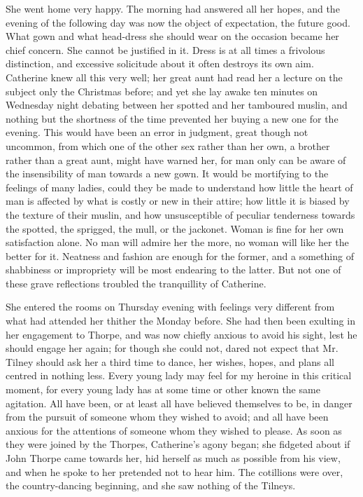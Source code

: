 She went home very happy. The morning had answered all her hopes, and the evening of the following day was now the object of expectation, the future good. What gown and what head-dress she should wear on the occasion became her chief concern. She cannot be justified in it. Dress is at all times a frivolous distinction, and excessive solicitude about it often destroys its own aim. Catherine knew all this very well; her great aunt had read her a lecture on the subject only the Christmas before; and yet she lay awake ten minutes on Wednesday night debating between her spotted and her tamboured muslin, and nothing but the shortness of the time prevented her buying a new one for the evening. This would have been an error in judgment, great though not uncommon, from which one of the other sex rather than her own, a brother rather than a great aunt, might have warned her, for man only can be aware of the insensibility of man towards a new gown. It would be mortifying to the feelings of many ladies, could they be made to understand how little the heart of man is affected by what is costly or new in their attire; how little it is biased by the texture of their muslin, and how unsusceptible of peculiar tenderness towards the spotted, the sprigged, the mull, or the jackonet. Woman is fine for her own satisfaction alone. No man will admire her the more, no woman will like her the better for it. Neatness and fashion are enough for the former, and a something of shabbiness or impropriety will be most endearing to the latter. But not one of these grave reflections troubled the tranquillity of Catherine.

She entered the rooms on Thursday evening with feelings very different from what had attended her thither the Monday before. She had then been exulting in her engagement to Thorpe, and was now chiefly anxious to avoid his sight, lest he should engage her again; for though she could not, dared not expect that Mr. Tilney should ask her a third time to dance, her wishes, hopes, and plans all centred in nothing less. Every young lady may feel for my heroine in this critical moment, for every young lady has at some time or other known the same agitation. All have been, or at least all have believed themselves to be, in danger from the pursuit of someone whom they wished to avoid; and all have been anxious for the attentions of someone whom they wished to please. As soon as they were joined by the Thorpes, Catherine's agony began; she fidgeted about if John Thorpe came towards her, hid herself as much as possible from his view, and when he spoke to her pretended not to hear him. The cotillions were over, the country-dancing beginning, and she saw nothing of the Tilneys.

